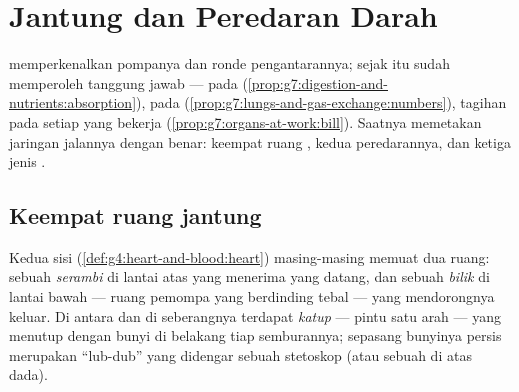 \chapter{Jantung dan Peredaran Darah}\label{ch:g7:heart-and-circulation}

 memperkenalkan pompanya dan ronde
pengantarannya; sejak itu  sudah memperoleh tanggung jawab ---
 pada 
(\cref{prop:g7:digestion-and-nutrients:absorption}),  pada
(\cref{prop:g7:lungs-and-gas-exchange:numbers}), tagihan pada setiap
 yang bekerja (\cref{prop:g7:organs-at-work:bill}). Saatnya
memetakan jaringan jalannya dengan benar: keempat ruang ,
kedua peredarannya, dan ketiga jenis .

\section{Keempat ruang jantung}

\begin{definition}\label{def:g7:heart-and-circulation:rooms}
Kedua sisi  (\cref{def:g4:heart-and-blood:heart}) masing-masing
memuat dua ruang: sebuah \emph{serambi} di lantai atas
yang menerima  yang datang, dan sebuah \emph{bilik}
di lantai bawah --- ruang pemompa yang berdinding tebal --- yang
mendorongnya keluar. Di antara dan di seberangnya terdapat
\emph{katup} --- pintu satu arah --- yang menutup
dengan bunyi di belakang tiap semburannya; sepasang bunyinya persis
merupakan ``lub-dub'' yang didengar sebuah stetoskop (atau sebuah
 di atas dada).
\end{definition}

